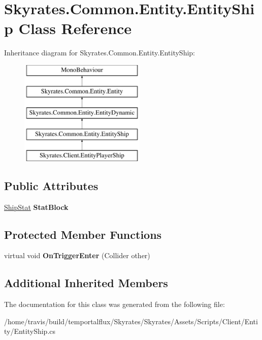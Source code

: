 \hypertarget{class_skyrates_1_1_common_1_1_entity_1_1_entity_ship}{\section{Skyrates.\-Common.\-Entity.\-Entity\-Ship Class Reference}
\label{class_skyrates_1_1_common_1_1_entity_1_1_entity_ship}
}
Inheritance diagram for Skyrates.\-Common.\-Entity.\-Entity\-Ship\-:\begin{figure}[H]
\begin{center}
\leavevmode
\includegraphics[height=5.000000cm]{class_skyrates_1_1_common_1_1_entity_1_1_entity_ship}
\end{center}
\end{figure}
\subsection*{Public Attributes}
\begin{DoxyCompactItemize}
\item 
\hypertarget{class_skyrates_1_1_common_1_1_entity_1_1_entity_ship_a11f35fb2c23a46c0c2d4980b1fa3380c}{\hyperlink{class_ship_stat}{Ship\-Stat} {\bfseries Stat\-Block}}\label{class_skyrates_1_1_common_1_1_entity_1_1_entity_ship_a11f35fb2c23a46c0c2d4980b1fa3380c}

\end{DoxyCompactItemize}
\subsection*{Protected Member Functions}
\begin{DoxyCompactItemize}
\item 
\hypertarget{class_skyrates_1_1_common_1_1_entity_1_1_entity_ship_aa0550b01a86006271ca0e8b07623662a}{virtual void {\bfseries On\-Trigger\-Enter} (Collider other)}\label{class_skyrates_1_1_common_1_1_entity_1_1_entity_ship_aa0550b01a86006271ca0e8b07623662a}

\end{DoxyCompactItemize}
\subsection*{Additional Inherited Members}


The documentation for this class was generated from the following file\-:\begin{DoxyCompactItemize}
\item 
/home/travis/build/temportalflux/\-Skyrates/\-Skyrates/\-Assets/\-Scripts/\-Client/\-Entity/Entity\-Ship.\-cs\end{DoxyCompactItemize}
